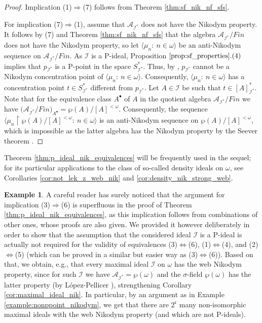 \documentclass[a4paper,11pt,fleqn]{amsart}
\theoremstyle{definition}
\newtheorem{example}[theorem]{Example}
\theoremstyle{remark}
\numberwithin{equation}{section}
\newcommand{\frakc}{\mathfrak{c}}
\newcommand{\N}{\mathbb{N}}
\newcommand{\aA}{\mathcal{A}}
\newcommand{\iI}{\mathcal{I}}
\newcommand{\rstr}{\restriction}
\newcommand{\seqn}[1]{\big\langle#1\colon\ n\io\big\rangle}
\newcommand{\clopen}[1]{\left[#1\right]}
\newcommand{\io}{\in\omega}%
\newcommand{\wo}{{\wp(\omega)}}%
\begin{document}
\begin{proof}
Implication (1)$\Rightarrow$(7) follows from Theorem \ref{thm:sf_nik_nf_sfs}. 

For implication (7)$\Rightarrow$(1), assume that $\aA_{\iI^*}$ does not have the Nikodym property. It follows by (7) and Theorem \ref{thm:sf_nik_nf_sfs} that the algebra $\aA_{\iI^*}/Fin$ does not have the Nikodym property, so let $\seqn{\mu_n}$ be an anti-Nikodym sequence on $\aA_{\iI^*}/Fin$. As $\iI$ is a P-ideal, Proposition $\ref{prop:sf_properties}.(4)$ implies that $p_{\iI^*}$ is a P-point in the space $S_{\iI^*}^*$. Thus, by \cite[Proposition 4.5]{Sob19}, $p_{\iI^*}$ cannot be a Nikodym concentration point of $\seqn{\mu_n}$. Consequently, $\seqn{\mu_n}$ has a concentration point $t\in S_{\iI^*}^*$ different from $p_{\iI^*}$. Let $A\in\iI$ be such that $t\in\clopen{A}_{\iI^*}^*$. Note that for the equivalence class $A^\bullet$ of $A$ in the quotient algebra $\aA_{\iI^*}/Fin$ we have $\big(\aA_{\iI^*}/Fin\big)_{A^\bullet}=\wp(A)/[A]^{<\omega}$. Consequently, the sequence $\seqn{\mu_n\rstr\wp(A)/[A]^{<\omega}}$ is an anti-Nikodym sequence on $\wp(A)/[A]^{<\omega}$, which is impossible as the latter algebra has the Nikodym property by the Seever theorem \cite{See68}.
\end{proof}

Theorem \ref{thm:p_ideal_nik_equivalences} will be frequently used in the sequel; for its particular applications to the class of so-called density ideals on $\omega$, see Corollaries \ref{cor:not_lek_z_web_nik} and \ref{cor:density_nik_strong_web}.

\begin{example}\label{example:nonppoint_web_nikodym}
    A careful reader has surely noticed that the argument for implication (3)$\Rightarrow$(6) is superfluous in the proof of Theorem \ref{thm:p_ideal_nik_equivalences}, as this implication follows from combinations of other ones, whose proofs are also given. We provided it however deliberately in order to show that the assumption that the considered ideal $\iI$ is a P-ideal is actually not required for the validity of equivalences (3)$\Leftrightarrow$(6), (1)$\Leftrightarrow$(4), and (2)$\Leftrightarrow$(5) (which can be proved in a similar but easier way as (3)$\Leftrightarrow$(6)). Based on that, we obtain, e.g., that every maximal ideal $\iI$ on $\omega$ has the web Nikodym property, since for such $\iI$ we have $\aA_{\iI^*}=\wo$ and the $\sigma$-field $\wo$ has the latter property (by L\'opez-Pellicer \cite{LP97}), strengthening Corollary \ref{cor:maximal_ideal_nik}. In particular, by an argument as in Example \ref{example:nonppoint_nikodym}, we get that there are $2^\frakc$ many non-isomorphic maximal ideals with the web Nikodym property (and which are not P-ideals).
\end{example}
\end{document}
